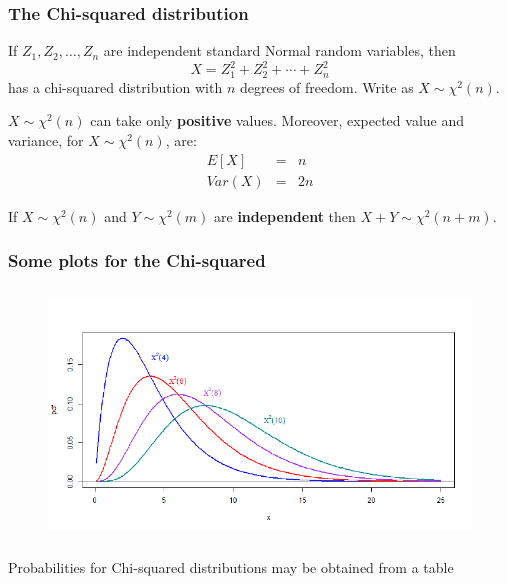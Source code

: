 \documentclass[notes=show,smaller,handout]{beamer}
\begin{document}

%
%
%
%
%


\begin{frame}%

\frametitle{The Chi-squared distribution}

\begin{definition}
If $Z_{1},Z_{2},\ldots ,Z_{n}$ are independent standard Normal random
variables, then%
\begin{equation*}
X=Z_{1}^{2}+Z_{2}^{2}+\cdots +Z_{n}^{2}
\end{equation*}%
has a chi-squared distribution with $n$ degrees of freedom. Write as $X\sim \chi ^{2}(n)$.
\end{definition}

$X\sim \chi ^{2}(n)$ can take only \textbf{positive }values. Moreover, expected value and variance, for $X\sim \chi ^{2}(n)$, are:
\begin{eqnarray*}
E\left[ X\right] &=&n \\
Var\left( X\right) &=&2n
\end{eqnarray*}

If $X\sim \chi ^{2}(n)$ and $Y\sim \chi ^{2}(m)$ are \textbf{%
independent} then $X+Y\sim \chi ^{2}(n+m)$.


\end{frame}

\begin{frame}%

\frametitle{Some plots for the Chi-squared}

\begin{figure}[ptb]\centering
\includegraphics[height=2.6143in, width=4.6643in]{chisquared_pdfs__2.pdf}%
\end{figure}

Probabilities for Chi-squared distributions may be obtained from a table

\end{frame}%
\end{document}
